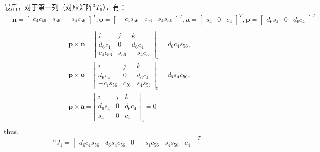 \documentclass{ctexart}
\begin{document}
最后，对于第一列（对应矩阵$^3T_6$），有：
\begin{equation*}
	\begin{aligned}
		&\boldsymbol{n} = \begin{bmatrix}
			c_4c_{56} & s_{56} & -s_4c_{56}
		\end{bmatrix}^T, \boldsymbol{o} = \begin{bmatrix}
			-c_4s_{56} & c_{56} & s_4s_{56}
		\end{bmatrix}^T, \boldsymbol{a} = \begin{bmatrix}
			s_4 & 0 & c_4
		\end{bmatrix}^T, \boldsymbol{p} = \begin{bmatrix}
			d_6s_4 & 0 & d_6c_4
		\end{bmatrix}^T\\
	\end{aligned}
\end{equation*}
\begin{equation}
	\begin{aligned}
		&\boldsymbol{p}\times \boldsymbol{n} = \left| \begin{matrix}
			i & j & k \\
			d_6s_4 & 0 & d_6c_4 \\
			c_4c_{56} & s_{56} & -s_4c_{56}
		\end{matrix} \right|_z = d_6c_4s_{56},\\& \boldsymbol{p}\times \boldsymbol{o} = \left| \begin{matrix}
			i & j & k \\
			d_6s_4 & 0 & d_6c_4 \\
			-c_4s_{56} & c_{56} & s_4s_{56}
		\end{matrix} \right|_z = d_6s_4c_{56}, \\&\boldsymbol{p}\times \boldsymbol{a} = \left| \begin{matrix}
			i & j & k \\
			d_6s_4 & 0 & d_6c_4 \\
			s_4 & 0 & c_4
		\end{matrix} \right|_z = 0\\
	\end{aligned}
\end{equation}
thus,
\begin{equation*}
^6J_{1} = \begin{bmatrix}
	d_6c_4s_{56} & d_6s_4c_{56} & 0 & -s_4c_{56} & s_4s_{56} & c_4
\end{bmatrix}^T
\end{equation*}
\end{document}
